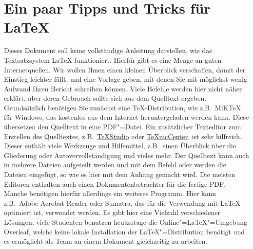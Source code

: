 \newpage
\appendix
\section{Ein paar Tipps und Tricks für \LaTeX}
\label{sec:Latex}
%
Dieses Dokument soll keine vollständige Anleitung darstellen, wie das Textsatzsystem \LaTeX{}  funktioniert. Hierfür gibt es eine Menge an guten Internetquellen. Wir wollen Ihnen einen kleinen Überblick verschaffen, damit der Einstieg leichter fällt, und eine Vorlage geben, mit denen Sie mit möglichst wenig Aufwand Ihren Bericht schreiben können. Viele Befehle werden hier nicht näher erklärt, aber deren Gebrauch sollte sich aus dem Quelltext ergeben. Grundsätzlich benötigen Sie zunächst eine TeX-Distribution, wie z.B.\ MiKTeX für Windows, das kostenlos aus dem Internet heruntergeladen werden kann. Diese übersetzen den Quelltext in eine PDF"=Datei. Ein zusätzlicher Texteditor zum Erstellen des Quelltextes, z.B.\ \href{https://www.texstudio.org/}{TeXStudio} oder \href{https://www.texniccenter.org/}{TeXnicCenter}, ist sehr hilfreich. Dieser enthält viele Werkzeuge und Hilfsmittel, z.B.\ einen Überblick über die Gliederung oder Autovervollständigung und vieles mehr. Der Quelltext kann auch in mehrere Dateien aufgeteilt werden und mit dem Befehl \verb++ oder \verb"" werden die Dateien eingefügt, so wie es hier mit dem Anhang gemacht wird. Die meisten Editoren enthalten auch einen Dokumentenbetrachter für die fertige PDF. Manche benötigen hierfür allerdings ein weiteres Programm. Hier kann z.B.\ Adobe Acrobat Reader oder Sumatra, das für die Verwendung mit \LaTeX{} optimiert ist, verwendet werden. Es gibt hier eine Vielzahl verschiedener Lösungen; viele Studenten benutzen heutzutage die Online"=\LaTeX"=Umgebung Overleaf, welche keine lokale Installation der \LaTeX"=Distribution benötigt und es ermöglicht als Team an einem Dokument gleichzeitig zu arbeiten.
%

